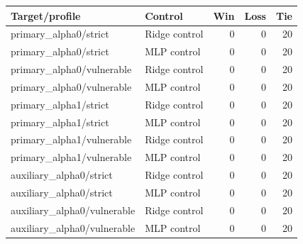 \begin{tabular}{llrrr}
\toprule
Target/profile & Control & Win & Loss & Tie \\
\midrule
primary\_alpha0/strict & Ridge control & 0 & 0 & 20 \\
primary\_alpha0/strict & MLP control & 0 & 0 & 20 \\
primary\_alpha0/vulnerable & Ridge control & 0 & 0 & 20 \\
primary\_alpha0/vulnerable & MLP control & 0 & 0 & 20 \\
primary\_alpha1/strict & Ridge control & 0 & 0 & 20 \\
primary\_alpha1/strict & MLP control & 0 & 0 & 20 \\
primary\_alpha1/vulnerable & Ridge control & 0 & 0 & 20 \\
primary\_alpha1/vulnerable & MLP control & 0 & 0 & 20 \\
auxiliary\_alpha0/strict & Ridge control & 0 & 0 & 20 \\
auxiliary\_alpha0/strict & MLP control & 0 & 0 & 20 \\
auxiliary\_alpha0/vulnerable & Ridge control & 0 & 0 & 20 \\
auxiliary\_alpha0/vulnerable & MLP control & 0 & 0 & 20 \\
\bottomrule
\end{tabular}
